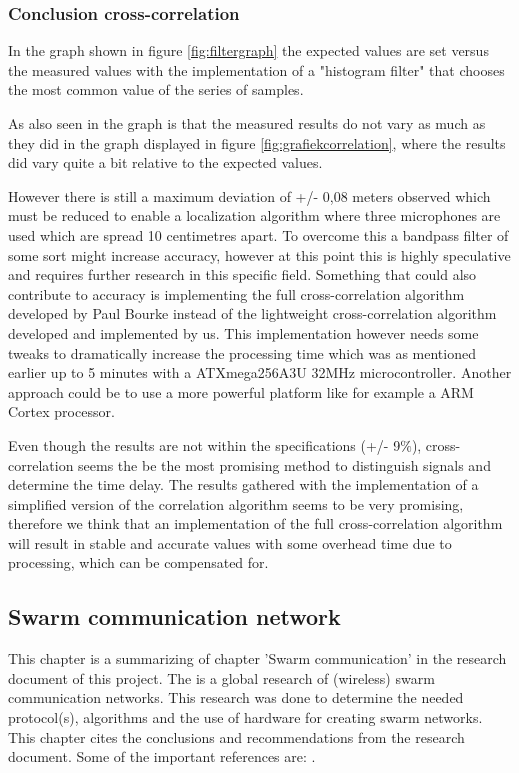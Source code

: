 \documentclass[10pt,a4paper]{article}
\begin{document}
\subsubsection{Conclusion cross-correlation}
In the graph shown in figure \ref{fig:filtergraph} the expected values are set versus the measured values with the implementation of a "histogram filter" that chooses the most common value of the series of samples. 

As also seen in the graph is that the measured results do not vary as much as they did in the graph displayed in figure \ref{fig:grafiekcorrelation}, where the results did vary quite a bit relative to the expected values. 

However there is still a maximum deviation of +/- 0,08 meters observed which must be reduced to enable a localization algorithm where three microphones are used which are spread 10 centimetres apart. To overcome this a bandpass filter of some sort might increase accuracy, however at this point this is highly speculative and requires further research in this specific field. Something that could also contribute to accuracy is implementing the full cross-correlation algorithm developed by Paul Bourke instead of the lightweight cross-correlation algorithm developed and implemented by us. This implementation however needs some tweaks to dramatically increase the processing time which was as mentioned earlier up to 5 minutes with a ATXmega256A3U 32MHz microcontroller. Another approach could be to use a more powerful platform like for example a ARM Cortex processor.

Even though the results are not within the specifications (+/- 9$\%$), cross-correlation seems the be the most promising method to distinguish signals and determine the time delay. The results gathered with the implementation of a simplified version of the correlation algorithm seems to be very promising, therefore we think that an implementation of the full cross-correlation algorithm will result in stable and accurate values with some overhead time due to processing, which can be compensated for.


\subsection{Swarm communication network}
This chapter is a summarizing of chapter 'Swarm communication' in the research document of this project. The is a global research of (wireless) swarm communication networks. This research was done to determine the needed protocol(s), algorithms and the use of hardware for creating swarm networks. This chapter cites the conclusions and recommendations from the research document. Some of the important references are: \cite{combook} \cite{multi-hopwirelessnetworks} \cite{meshnetworking} \cite{position-based}.
\end{document}
